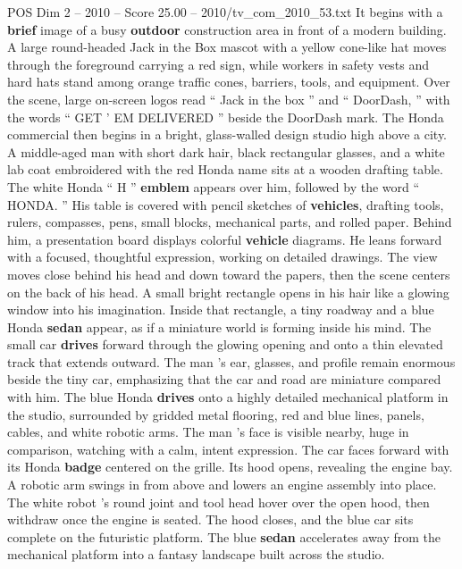 \begin{textsample}{POS Dim 2 – 2010 – Score 25.00 – 2010/tv\_com\_2010\_53.txt}  \label{ex:f2_pos_052}
It begins with a \textbf{brief} image of a busy \textbf{outdoor} construction area in front of a modern building.
A large round-headed Jack in the Box mascot with a yellow cone-like hat moves through the foreground carrying a red sign, while workers in safety vests and hard hats stand among orange traffic cones, barriers, tools, and equipment.
Over the scene, large on-screen logos read “ Jack in the box ” and “ DoorDash, ” with the words “ GET ’ EM DELIVERED ” beside the DoorDash mark.
The Honda commercial then begins in a bright, glass-walled design studio high above a city.
A middle-aged man with short dark hair, black rectangular glasses, and a white lab coat embroidered with the red Honda name sits at a wooden drafting table.
The white Honda “ H ” \textbf{emblem} appears over him, followed by the word “ HONDA. ” His table is covered with pencil sketches of \textbf{vehicles}, drafting tools, rulers, compasses, pens, small blocks, mechanical parts, and rolled paper.
Behind him, a presentation board displays colorful \textbf{vehicle} diagrams.
He leans forward with a focused, thoughtful expression, working on detailed drawings.
The view moves close behind his head and down toward the papers, then the scene centers on the back of his head.
A small bright rectangle opens in his hair like a glowing window into his imagination.
Inside that rectangle, a tiny roadway and a blue Honda \textbf{sedan} appear, as if a miniature world is forming inside his mind.
The small car \textbf{drives} forward through the glowing opening and onto a thin elevated track that extends outward.
The man ’s ear, glasses, and profile remain enormous beside the tiny car, emphasizing that the car and road are miniature compared with him.
The blue Honda \textbf{drives} onto a highly detailed mechanical platform in the studio, surrounded by gridded metal flooring, red and blue lines, panels, cables, and white robotic arms.
The man ’s face is visible nearby, huge in comparison, watching with a calm, intent expression.
The car faces forward with its Honda \textbf{badge} centered on the grille.
Its hood opens, revealing the engine bay.
A robotic arm swings in from above and lowers an engine assembly into place.
The white robot ’s round joint and tool head hover over the open hood, then withdraw once the engine is seated.
The hood closes, and the blue car sits complete on the futuristic platform.
The blue \textbf{sedan} accelerates away from the mechanical platform into a fantasy landscape built across the studio.

\end{textsample}
